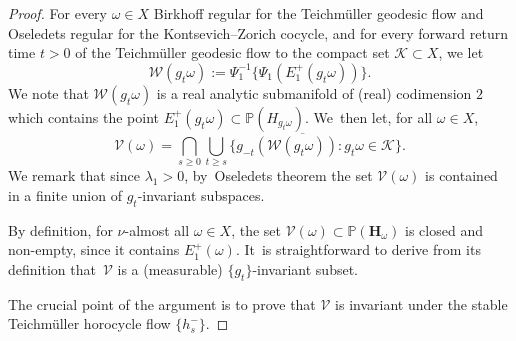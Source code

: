 \documentclass[JEP,XML,SOM,Unicode,published]{cedram}
\let\sep:
\theoremstyle{plain}
\theoremstyle{definition}
\numberwithin{equation}{subsection}
\newcommand\bP{\mathbb{P}}
\newcommand\cK{\mathcal{K}}
\newcommand\cV{\mathcal{V}}
\newcommand\cW{\mathcal{W}}
\newcommand{\bfH}{\boldsymbol{H}}
\begin{document}
\begin{proof}
For every $\omega\in X$
Birkhoff regular for the Teichmüller geodesic flow and Oseledets regular for the Kontsevich--Zorich cocycle, and for every forward return time $t > 0$ of the Teichmüller geodesic flow to the compact set $\cK \subset X$, we let
\begin{equation}
\label{eq:cW}
\cW (g_{t}\omega):= \Psi_1^{-1} \bigl\{ \Psi_1 (E^+_1 (g_{t} \omega)) \bigr\}.
\end{equation}
We note that $\cW(g_{t}\omega)$ is a real analytic submanifold of (real) codimension $2$
which contains the point $E^+_1(g_{t}\omega) \subset \bP (H_{g_{t}\omega})$. We~then let, for all $\omega \in X$,
\[
\cV (\omega) = \bigcap_{s\geq 0} \overline{\bigcup_{t\geq s} \{ g_{-t} \left(\cW(g_{t}\omega)\right) \sep g_{t}\omega \in \cK\} }.
\]
We remark that since $\lambda_1>0$, by~Oseledets theorem the set $\cV(\omega)$ is contained in a finite union of $g_t$-invariant subspaces.

By definition, for $\nu$-almost all $\omega \in X$, the set $\cV(\omega)
\subset \bP({\bfH}_\omega)$ is closed and non-empty, since it contains $E^+_1(\omega)$. It~is straightforward to derive from its definition that~$\cV$ is a (measurable) $\{g_t\}$-invariant subset.

The crucial point of the argument is to prove that
$\cV$ is invariant under the stable Teichmüller horocycle flow $\{h^-_s\}$.


\end{proof}
\end{document}
